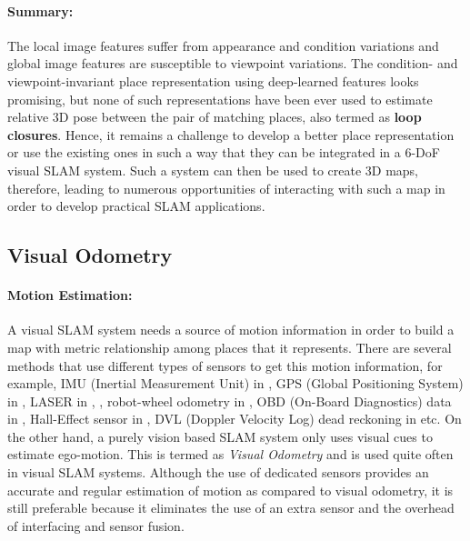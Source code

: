 \documentclass{article}
\begin{document}
\paragraph{Summary:}
The local image features suffer from appearance and condition variations and global image features are susceptible to viewpoint variations. The condition- and viewpoint-invariant place representation using deep-learned features looks promising, but none of such representations have been ever used to estimate relative 3D pose between the pair of matching places, also termed as \textbf{loop closures}. Hence, it remains a challenge to develop a better place representation or use the existing ones in such a way that they can be integrated in a 6-DoF visual SLAM system. Such a system can then be used to create 3D maps, therefore, leading to numerous opportunities of interacting with such a map in order to develop practical SLAM applications. 

\subsection{Visual Odometry}
\paragraph{Motion Estimation:} A visual SLAM system needs a source of motion information in order to build a map with metric relationship among places that it represents. There are several methods that use different types of sensors to get this motion information, for example, IMU (Inertial Measurement Unit) in \cite{Kneip2011, Milford2014}, GPS (Global Positioning System) in \cite{Agrawal2006, Floros2013}, LASER in \cite{Kohlbrecher2011}, \cite{Paul2010}, robot-wheel odometry in \cite{Bazeille2011}, OBD (On-Board Diagnostics) data in \cite{pepperell2015automatic,Pepperell2014}, Hall-Effect sensor in \cite{Pepperell2014}, DVL (Doppler Velocity Log) dead reckoning in \cite{Mahon2008} etc. On the other hand, a purely vision based SLAM system only uses visual cues to estimate ego-motion. This is termed as \emph{Visual Odometry} and is used quite often in visual SLAM systems. Although the use of dedicated sensors provides an accurate and regular estimation of motion as compared to visual odometry, it is still preferable because it eliminates the use of an extra sensor and the overhead of interfacing and sensor fusion.
\end{document}
